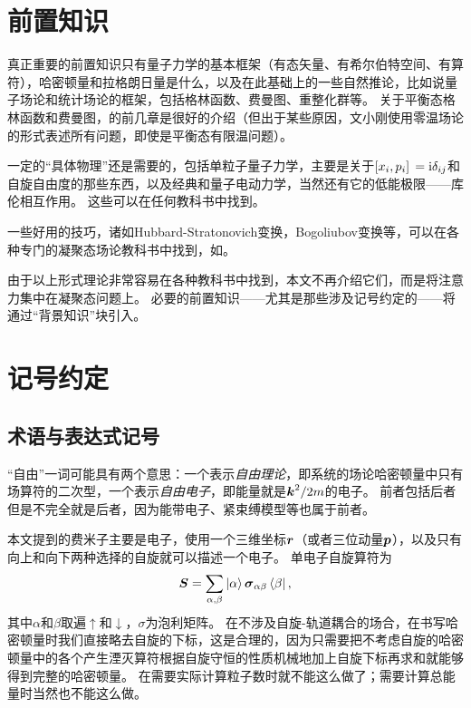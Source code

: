 \section*{前置知识}

真正重要的前置知识只有量子力学的基本框架（有态矢量、有希尔伯特空间、有算符），哈密顿量和拉格朗日量是什么，以及在此基础上的一些自然推论，比如说量子场论和统计场论的框架，包括格林函数、费曼图、重整化群等。
关于平衡态格林函数和费曼图，\cite{wen2004quantum}的前几章是很好的介绍（但出于某些原因，文小刚使用零温场论的形式表述所有问题，即使是平衡态有限温问题）。

一定的“具体物理”还是需要的，包括单粒子量子力学，主要是关于$\comm*{x_i}{p_i} = \ii \delta_{ij}$和自旋自由度的那些东西，以及经典和量子电动力学，当然还有它的低能极限——库伦相互作用。
这些可以在任何教科书中找到。

一些好用的技巧，诸如Hubbard-Stratonovich变换，Bogoliubov变换等，可以在各种专门的凝聚态场论教科书中找到，如\cite{altland2010condensed}。

由于以上形式理论非常容易在各种教科书中找到，本文不再介绍它们，而是将注意力集中在凝聚态问题上。
必要的前置知识——尤其是那些涉及记号约定的——将通过“背景知识”块引入。

\section*{记号约定}

\subsection*{术语与表达式记号}

“自由”一词可能具有两个意思：一个表示\emph{自由理论}，即系统的场论哈密顿量中只有场算符的二次型，一个表示\emph{自由电子}，即能量就是$\vb*{k}^2/2m$的电子。
前者包括后者但是不完全就是后者，因为能带电子、紧束缚模型等也属于前者。

本文提到的费米子主要是电子，使用一个三维坐标$\vb*{r}$（或者三位动量$\vb*{p}$），以及只有向上和向下两种选择的自旋就可以描述一个电子。
单电子自旋算符为
\begin{equation}
    {\vb*{S}} = \sum_{\alpha, \beta} \ket{\alpha} \vb*{\sigma}_{\alpha \beta} \bra{\beta},
\end{equation}
其中$\alpha$和$\beta$取遍$\uparrow$和$\downarrow$，$\sigma$为泡利矩阵。
在不涉及自旋-轨道耦合的场合，在书写哈密顿量时我们直接略去自旋的下标，这是合理的，因为只需要把不考虑自旋的哈密顿量中的各个产生湮灭算符根据自旋守恒的性质机械地加上自旋下标再求和就能够得到完整的哈密顿量。
在需要实际计算粒子数时就不能这么做了；需要计算总能量时当然也不能这么做。

